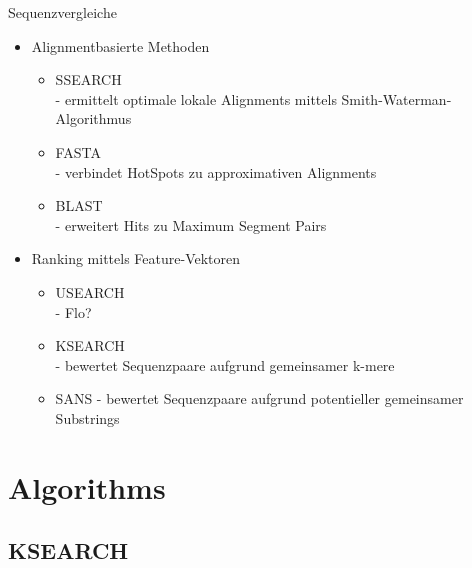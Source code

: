 \documentclass[aspectratio=1610]{beamer}
\begin{document}
\begin{frame}{Sequenzvergleiche}
  \begin{itemize}
    \item Alignmentbasierte Methoden
      \begin{itemize}
        \item SSEARCH\\
              - ermittelt optimale lokale Alignments mittels Smith-Waterman-Algorithmus
        \item FASTA\\
              - verbindet HotSpots zu approximativen Alignments
        \item BLAST\\
              - erweitert Hits zu Maximum Segment Pairs
      \end{itemize}
    \item Ranking mittels Feature-Vektoren
      \begin{itemize}
        \item USEARCH\\
              - Flo?
        \item KSEARCH\\
              - bewertet Sequenzpaare aufgrund gemeinsamer k-mere
        \item SANS
              - bewertet Sequenzpaare aufgrund potentieller gemeinsamer Substrings
      \end{itemize}
  \end{itemize}
\end{frame}

\section{Algorithms}

\subsection{KSEARCH}

%
\end{document}

